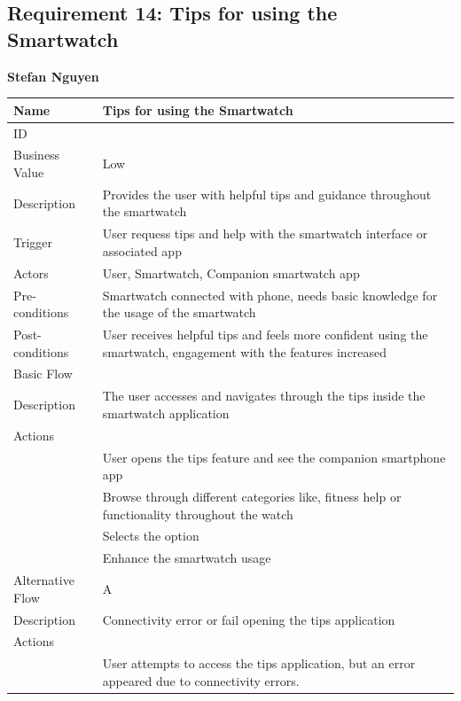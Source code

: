 \documentclass{article}
\begin{document}
\subsection{Requirement 14: Tips for using the Smartwatch}
	\textbf{Stefan Nguyen}
	\begin{center}
		\begin{tabularx}{1.0\textwidth}{|>{\raggedright\arraybackslash}p{}|>{\raggedright\arraybackslash}X|}
			\hline
			Name             & Tips for using the Smartwatch \\ \hline
			ID               & 14 \\ \hline
			Business Value   & Low \\ \hline
			Description      & Provides the user with helpful tips and guidance throughout the smartwatch \\ \hline
			Trigger          & User requess tips and help with the smartwatch interface or associated app \\ \hline
			Actors           & User, Smartwatch, Companion smartwatch app \\ \hline
			Pre-conditions   & Smartwatch connected with phone, needs basic knowledge for the usage of the smartwatch \\ \hline
			Post-conditions  & User receives helpful tips and feels more confident using the smartwatch, engagement with the features increased \\ \hline
			Basic Flow       & \\ \hline
							Description & The user accesses and navigates through the tips inside the smartwatch application \\ \hline
							Actions & \\ \hline
							1 & User opens the tips feature and see the companion smartphone app \\ \hline
							2 & Browse through different categories like, fitness help or functionality throughout the watch \\ \hline
							3 & Selects the option \\ \hline
							4 & Enhance the smartwatch usage \\ \hline
			Alternative Flow & A \\ \hline
							Description & Connectivity error or fail opening the tips application \\ \hline
							Actions & \\ \hline
							1 & User attempts to access the tips application, but an error appeared due to connectivity errors. \\ \hline

\end{tabularx}
\end{center}
\end{document}
